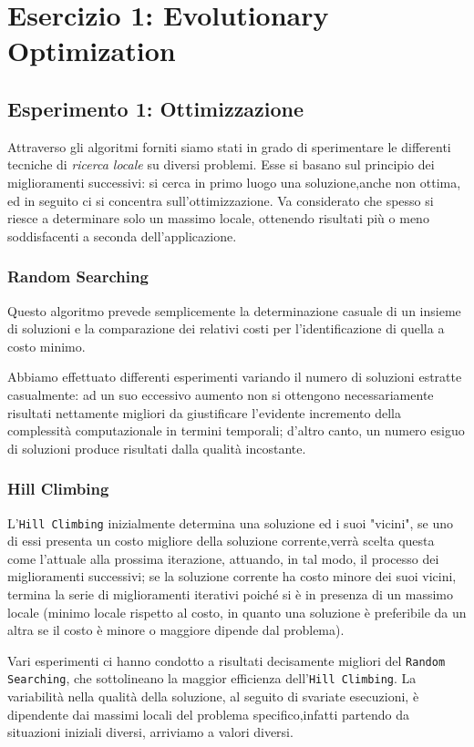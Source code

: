 \raggedright
{}
	\label{ch:opt}
	\section{Esercizio 1: Evolutionary Optimization}
		\label{sec:es1}
		\subsection{Esperimento 1: Ottimizzazione}
			Attraverso gli algoritmi forniti siamo stati in grado di sperimentare le differenti tecniche di \emph{ricerca locale} su diversi problemi. Esse si basano sul principio dei miglioramenti successivi: si cerca in primo luogo una soluzione,anche non ottima, ed in seguito ci si concentra sull'ottimizzazione. Va considerato che spesso si riesce a determinare solo un massimo locale, ottenendo risultati più o meno soddisfacenti a seconda dell'applicazione.
			\subsubsection{Random Searching}
				Questo algoritmo prevede semplicemente la determinazione casuale di un insieme di soluzioni e la comparazione dei relativi costi per l'identificazione di quella a costo minimo.\par
				Abbiamo effettuato differenti esperimenti variando il numero di soluzioni estratte casualmente: ad un suo eccessivo aumento non si ottengono necessariamente risultati nettamente migliori da giustificare l'evidente incremento della complessità computazionale in termini temporali; d'altro canto, un numero esiguo di soluzioni produce risultati dalla qualità incostante.
			\subsubsection{Hill Climbing}
				L'\texttt{Hill Climbing} inizialmente determina una soluzione ed i suoi "vicini", se uno di essi presenta un costo migliore della soluzione corrente,verrà scelta questa come l'attuale  alla prossima iterazione, attuando, in tal modo, il processo dei miglioramenti successivi; se la soluzione corrente ha costo minore dei suoi vicini, termina la serie di miglioramenti iterativi poiché si è in presenza di un massimo locale (minimo locale rispetto al costo, in quanto una soluzione è preferibile da un altra se il costo è minore o maggiore dipende dal problema).\par
				Vari esperimenti ci hanno condotto a risultati decisamente migliori del \texttt{Random Searching}, che sottolineano la maggior efficienza dell'\texttt{Hill Climbing}. La variabilità nella qualità della soluzione, al seguito di svariate esecuzioni, è dipendente dai massimi locali del problema specifico,infatti partendo da situazioni iniziali diversi, arriviamo a valori diversi.
